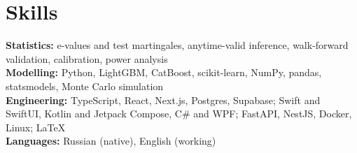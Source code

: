 \documentclass[letterpaper,10pt]{article}
\newif\ifresume
\newcommand{\rs}[2]{\ifresume#1\else#2\fi}
\begin{document}
\section*{Skills}
\textbf{Statistics:} e-values and test martingales, anytime-valid inference, walk-forward validation, calibration, power analysis\\
\textbf{Modelling:} Python, LightGBM, CatBoost, scikit-learn, NumPy, pandas, statsmodels, Monte Carlo simulation\\
\textbf{Engineering:} \rs{TypeScript, React, Next.js, Postgres; Swift, Kotlin, C\#; FastAPI, NestJS, Docker, Linux; \LaTeX}%
                        {TypeScript, React, Next.js, Postgres, Supabase; Swift and SwiftUI, Kotlin and Jetpack Compose, C\# and WPF; FastAPI, NestJS, Docker, Linux; \LaTeX}\\
\textbf{Languages:} Russian (native), English (working)
\end{document}
